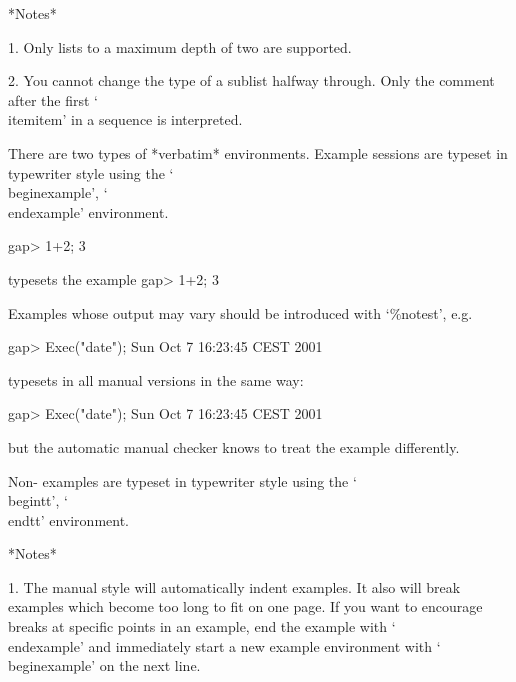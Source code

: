 *Notes*

\beginlist%
\item{1.} Only lists to a maximum depth of two are supported.

\item{2.} You cannot change the type of a sublist halfway through. Only
the comment after the first `\\itemitem' in a sequence is interpreted.

\endlist

\indextt{\\begintt}\indextt{\\endtt}
\indextt{\\beginexample}\indextt{\\endexample}
There are two types of *verbatim* environments.
Example {\GAP} sessions are typeset in typewriter style
using the `\\beginexample', `\\endexample' environment.

\begintt
\beginexample
gap> 1+2;
3
\endexample
\endtt

typesets the example
\beginexample
gap> 1+2;
3
\endexample

Examples whose output may vary should be introduced with `\%notest', e.g.

\begintt
\beginexample
gap> Exec("date");
Sun Oct  7 16:23:45 CEST 2001
\endexample
\endtt

typesets in all manual versions in the same way:

\beginexample
gap> Exec("date");
Sun Oct  7 16:23:45 CEST 2001
\endexample

but the automatic manual checker knows to treat the example differently.

Non-{\GAP} examples are typeset in typewriter style
using the `\\begintt', `\\endtt' environment.

*Notes*

\beginlist%

\item{1.}
The manual style will automatically indent examples. It also will break
examples which become too long to fit on one page. If you want to encourage
breaks at specific points in an example, end the example with `\\endexample'
and immediately start a new example environment with `\\beginexample' on
the next line.


